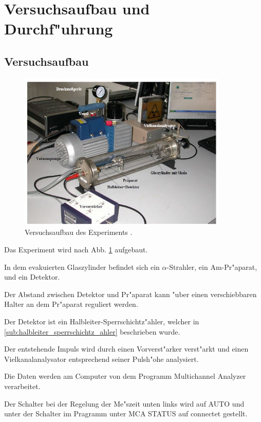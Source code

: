 \section{Versuchsaufbau und Durchf"uhrung} %

\label{sec:durchf_uhrung}
	
	\subsection{Versuchsaufbau} %
	\label{sub:versuchsaufbau}
	
	\begin{figure}[!h]
		\centering
		\includegraphics[width = 10cm]{img/Aufbau.JPG}
		\caption{Versuchsaufbau des Experiments \cite{anleitung}.}
		\label{fg:aufbau}
	\end{figure}

	Das Experiment wird nach Abb. \ref{fg:aufbau} aufgebaut.

	In dem evakuierten Glaszylinder befindet sich ein $\alpha$-Strahler, ein Am-Pr"aparat, und ein Detektor.

	Der Abstand zwischen Detektor und Pr"aparat kann "uber einen verschiebbaren Halter an dem Pr"aparat reguliert werden.

	Der Detektor ist ein Halbleiter-Sperrschichtz"ahler, welcher in \ref{sub:halbleiter_sperrschichtz_ahler} beschrieben wurde.

	Der entstehende Impuls wird durch einen Vorverst"arker verst"arkt und einen Vielkanalanalysator entsprechend seiner Pulsh"ohe analysiert.

	Die Daten werden am Computer von dem Programm Multichannel 
	Analyzer verarbeitet.

	Der Schalter bei der Regelung der Me"szeit unten links wird auf AUTO  und unter der Schalter im Pragramm unter MCA STATUS 
	auf connectet gestellt.

